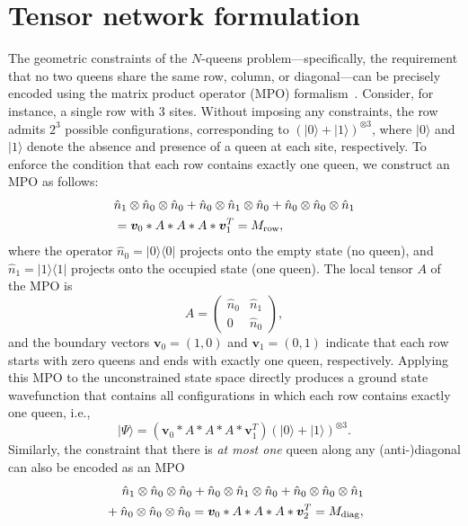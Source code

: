 \documentclass[aps, pre, reprint, amsmath, amssymb, superscriptaddress, floatfix]{revtex4-2}
\begin{document}
\section{Tensor network formulation}
\label{sec:tensor}
The geometric constraints of the $N$-queens problem---specifically,
the requirement that no two queens share the same row, column, or diagonal---can be
precisely encoded using the matrix product operator (MPO) formalism~\cite{Frowis2010,Verstraete2022}.
Consider, for instance, a single row with 3 sites. Without imposing any constraints,
the row admits $2^3$ possible configurations, corresponding to
$(|0\rangle + |1\rangle)^{\otimes 3}$, where $|0\rangle$ and
$|1\rangle$ denote the absence and presence of a queen at each site, respectively.
To enforce the condition that each row contains exactly one queen, we construct an MPO as follows:
\begin{align}
  & \hat{n}_1 \otimes \hat{n}_0 \otimes \hat{n}_0 
  + \hat{n}_0 \otimes \hat{n}_1 \otimes \hat{n}_0 
  + \hat{n}_0 \otimes \hat{n}_0 \otimes \hat{n}_1 \nonumber \\
  & =  \bm{v}_0 * A * A * A * \bm{v}_1^T = M_{\rm row},
\end{align}
where the operator $\hat{n}_0 = |0\rangle\langle 0|$ projects onto
the empty state (no queen), and $\hat{n}_1 = |1\rangle\langle 1|$
projects onto the occupied state (one queen). The local tensor $A$ of the MPO is
\begin{equation}
  A = \begin{pmatrix}
    \hat{n}_0 & \hat{n}_1 \\
    0         & \hat{n}_0  
  \end{pmatrix}, 
\end{equation}
and the boundary vectors $\bm{v}_0 = (1, 0)$ and $\bm{v}_1 = (0, 1)$
indicate that each row starts with zero queens and ends with exactly
one queen, respectively. Applying this MPO to the unconstrained state
space directly produces a ground state wavefunction that contains all
configurations in which each row contains exactly one queen, i.e.,
\begin{equation} 
|\Psi \rangle =  (\bm{v}_0 * A * A * A * \bm{v}_1^T) (|0\rangle + |1\rangle)^{\otimes 3}.
\end{equation}
Similarly, the constraint that there is \emph{at most one} queen along
any (anti-)diagonal can also be encoded as an MPO
\begin{align}
  &\,\,\,\,\,\,\,\, \hat{n}_1 \otimes \hat{n}_0 \otimes \hat{n}_0 
   + \hat{n}_0 \otimes \hat{n}_1 \otimes \hat{n}_0 
   + \hat{n}_0 \otimes \hat{n}_0 \otimes \hat{n}_1 \nonumber \\
 & + \hat{n}_0 \otimes \hat{n}_0 \otimes \hat{n}_0 =  \bm{v}_0 * A * A * A * \bm{v}_2^T = M_{\rm diag},
\end{align}
\end{document}
